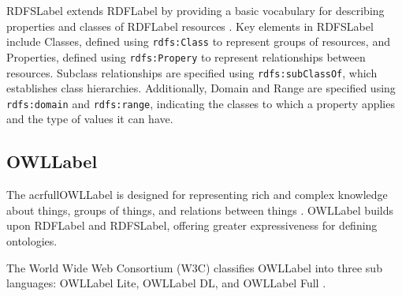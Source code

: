 \acrfull{RDFSLabel} extends \acrshort{RDFLabel} by providing a basic vocabulary for describing properties and classes of  \acrshort{RDFLabel} resources \cite{danbrickleyRDFSchema112014}. Key elements in \acrshort{RDFSLabel} include Classes, defined using \texttt{rdfs:Class} to represent groups of resources, and Properties, defined using \texttt{rdfs:Propery} to represent relationships between resources. Subclass relationships are specified using \texttt{rdfs:subClassOf}, which establishes class hierarchies. Additionally, Domain and Range are specified using \texttt{rdfs:domain} and \texttt{rdfs:range}, indicating the classes to which a property applies and the type of values it can have.


\subsection{\acrfull{OWLLabel}}\label{II-subsec:owl}

The acrfull{OWLLabel} is designed for representing rich and complex knowledge about things, groups of things, and relations between things \cite{OWLWebOntologya,bechhoferOWLWebOntology2009, OWLWebOntologyb, OWLWebOntologyc}. \acrshort{OWLLabel} builds upon \acrshort{RDFLabel} and \acrshort{RDFSLabel}, offering greater expressiveness for defining ontologies.

The World Wide Web Consortium (W3C) classifies \acrshort{OWLLabel} into three sub languages: \acrshort{OWLLabel} Lite, \acrshort{OWLLabel} DL, and \acrshort{OWLLabel} Full \cite{bechhoferOWLWebOntology2009}.

